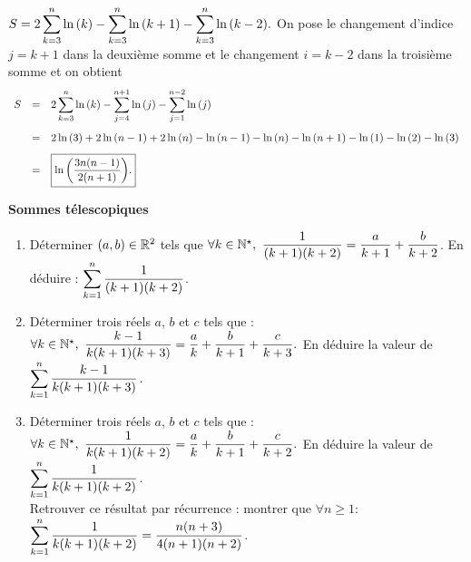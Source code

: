 \documentclass[a4paper, 11pt,reqno]{article}
\begin{document}
\begin{correction}
\begin{enumerate}
$S=2\displaystyle \sum\limits_{k=3}^{n} \ln{(k)}-\displaystyle \sum\limits_{k=3}^{n} \ln{(k+1)}-\displaystyle \sum\limits_{k=3}^{n} \ln{(k-2)}.$ On pose le changement d'indice $j=k+1$ dans la deuxi\`{e}me somme et le changement $i=k-2$ dans la troisi\`{e}me somme et on obtient 
$$\begin{array}{lll}
S&=&2\ddp \sum\limits_{k=3}^{n} \ln{(k)}-\ddp \sum\limits_{j=4}^{n+1} \ln{(j)}-\ddp \sum\limits_{j=1}^{n-2} \ln{(j)}\vsec\\
&=& 2\ln{(3)}+2\ln{(n-1)}+2\ln{(n)}-\ln{(n-1)}-\ln{(n)}-\ln{(n+1)}-\ln{(1)}-\ln{(2)}-\ln{(3)}\vsec\\
&=& \fbox{$\ln{\left( \ddp\frac{ 3n(n-1) }{ 2(n+1) }  \right)}$.}\end{array}$$
\end{enumerate}
\end{correction}




\begin{exercice}  \; \textbf{Sommes t\'elescopiques}
\begin{enumerate}
\item D\'eterminer $(a,b)\in\mathbb{R}^2$ tels que $\forall k\in\N^{\star}, \ \ddp\frac{1}{(k+1)(k+2)}=\ddp\frac{a}{k+1}+\ddp\frac{b}{k+2}$. En d\'eduire : $\displaystyle \sum\limits_{k=1}^n \displaystyle\frac{1}{(k+1)(k+2)} $. 
\item D\'eterminer trois r\'eels $a$, $b$ et $c$ tels que : $\forall k\in\N^{\star},\ \ddp\frac{k-1}{k(k+1)(k+3)}=\ddp\frac{a}{k}+\ddp\frac{b}{k+1}+\ddp\frac{c}{k+3}.$ En d\'eduire la valeur de $\displaystyle \sum\limits_{k=1}^{n}  \displaystyle\frac{k-1}{k(k+1)(k+3)}$.
\item D\'eterminer trois r\'eels $a$, $b$ et $c$ tels que : $\forall k\in\N^{\star},\ \ddp\frac{1}{k(k+1)(k+2)}=\ddp\frac{a}{k}+\ddp\frac{b}{k+1}+\ddp\frac{c}{k+2}.$ En d\'eduire la valeur de $\displaystyle \sum\limits_{k=1}^{n}  \displaystyle\frac{1}{k(k+1)(k+2)}$.\\
Retrouver ce r\'esultat par r\'ecurrence : montrer que $\forall n\geq 1$: $\displaystyle \sum\limits_{k=1}^{n} \displaystyle\frac{1}{k(k+1)(k+2)}=\displaystyle\frac{n(n+3)}{4(n+1)(n+2)}$.
\end{enumerate}
\end{exercice}
\end{document}
